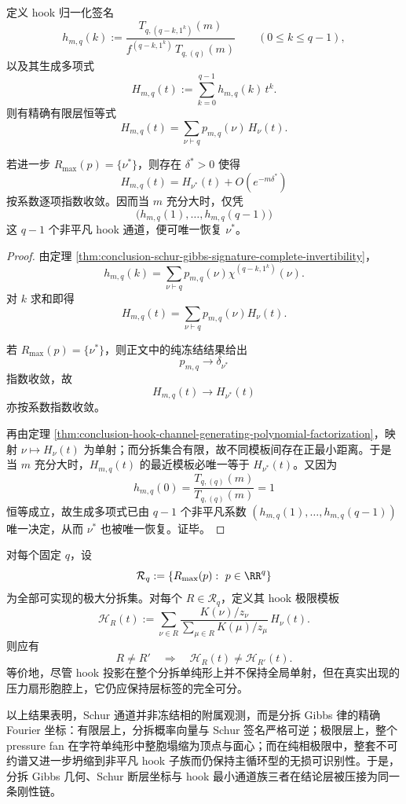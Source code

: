 \begin{theorem}\label{thm:conclusion-pure-phase-hook-family-complete-recovery}
定义 hook 归一化签名
\[
h_{m,q}(k):=
\frac{T_{q,(q-k,1^k)}(m)}
{f^{(q-k,1^k)}\,T_{q,(q)}(m)}
\qquad(0\le k\le q-1),
\]
以及其生成多项式
\[
H_{m,q}(t):=\sum_{k=0}^{q-1}h_{m,q}(k)\,t^k.
\]
则有精确有限层恒等式
\[
H_{m,q}(t)=\sum_{\nu\vdash q}p_{m,q}(\nu)\,H_\nu(t).
\]

若进一步 \(R_{\max}(p)=\{\nu^\ast\}\)，则存在 \(\delta^\ast>0\) 使得
\[
H_{m,q}(t)=H_{\nu^\ast}(t)+O(e^{-m\delta^\ast})
\]
按系数逐项指数收敛。因而当 \(m\) 充分大时，仅凭
\[
\bigl(h_{m,q}(1),\dots,h_{m,q}(q-1)\bigr)
\]
这 \(q-1\) 个非平凡 hook 通道，便可唯一恢复 \(\nu^\ast\)。
\end{theorem}
\begin{proof}
由定理 \ref{thm:conclusion-schur-gibbs-signature-complete-invertibility}，
\[
h_{m,q}(k)=\sum_{\nu\vdash q}p_{m,q}(\nu)\chi^{(q-k,1^k)}(\nu).
\]
对 \(k\) 求和即得
\[
H_{m,q}(t)=\sum_{\nu\vdash q}p_{m,q}(\nu)H_\nu(t).
\]

若 \(R_{\max}(p)=\{\nu^\ast\}\)，则正文中的纯冻结结果给出
\[
p_{m,q}\to \delta_{\nu^\ast}
\]
指数收敛，故
\[
H_{m,q}(t)\to H_{\nu^\ast}(t)
\]
亦按系数指数收敛。

再由定理 \ref{thm:conclusion-hook-channel-generating-polynomial-factorization}，映射 \(\nu\mapsto H_\nu(t)\) 为单射；而分拆集合有限，故不同模板间存在正最小距离。于是当 \(m\) 充分大时，\(H_{m,q}(t)\) 的最近模板必唯一等于 \(H_{\nu^\ast}(t)\)。又因为
\[
h_{m,q}(0)=\frac{T_{q,(q)}(m)}{T_{q,(q)}(m)}=1
\]
恒等成立，故生成多项式已由 \(q-1\) 个非平凡系数 \((h_{m,q}(1),\dots,h_{m,q}(q-1))\) 唯一决定，从而 \(\nu^\ast\) 也被唯一恢复。证毕。
\end{proof}

\begin{conjecture}\label{conj:conclusion-hook-stratum-separation}
对每个固定 \(q\)，设
\[
\mathcal R_q:=\{R_{\max}(p):\ p\in \RR^q\}
\]
为全部可实现的极大分拆集。对每个 \(R\in\mathcal R_q\)，定义其 hook 极限模板
\[
\mathcal H_R(t):=
\sum_{\nu\in R}
\frac{K(\nu)/z_\nu}{\sum_{\mu\in R}K(\mu)/z_\mu}\,
H_\nu(t).
\]
则应有
\[
R\neq R'
\quad\Longrightarrow\quad
\mathcal H_R(t)\neq \mathcal H_{R'}(t).
\]
等价地，尽管 hook 投影在整个分拆单纯形上并不保持全局单射，但在真实出现的压力扇形胞腔上，它仍应保持层标签的完全可分。
\end{conjecture}

\noindent
以上结果表明，Schur 通道并非冻结相的附属观测，而是分拆 Gibbs 律的精确 Fourier 坐标：有限层上，分拆概率向量与 Schur 签名严格可逆；极限层上，整个 pressure fan 在字符单纯形中整胞塌缩为顶点与面心；而在纯相极限中，整套不可约谱又进一步坍缩到非平凡 hook 子族而仍保持主循环型的无损可识别性。于是，分拆 Gibbs 几何、Schur 断层坐标与 hook 最小通道族三者在结论层被压接为同一条刚性链。

\endinput
